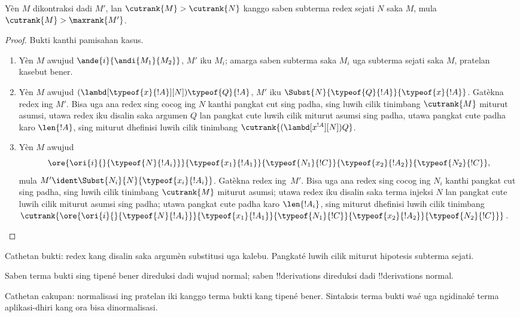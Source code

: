 \documentclass[../../../include/open-logic-section]{subfiles}
\begin{document}
\begin{lem}
  Yèn $M$ dikontraksi dadi $M'$, lan $\cutrank{M} > \cutrank{N}$ kanggo
  saben subterma redex sejati $N$ saka $M$, mula $\cutrank{M} >
  \maxrank{M'}$.
\end{lem}

\begin{proof}
  Bukti kanthi pamisahan kasus.
  \begin{enumerate}
  \item Yèn $M$ awujud $\ande{i}{\andi{M_1}{M_2}}$, $M'$ iku
    $M_i$; amarga saben subterma saka $M_i$ uga subterma sejati
    saka $M$, pratelan kasebut bener.
  \item Yèn $M$ awujud
    $(\lambd[\typeof{x}{!A}][N])\typeof{Q}{!A}$, $M'$ iku
    $\Subst{N}{\typeof{Q}{!A}}{\typeof{x}{!A}}$. Gatèkna redex ing
    $M'$. Bisa uga ana redex sing cocog ing $N$ kanthi pangkat cut
    sing padha, sing luwih cilik tinimbang $\cutrank{M}$ miturut asumsi,
    utawa redex iku disalin saka argumen $Q$ lan pangkat cute luwih cilik
    miturut asumsi sing padha, utawa pangkat cute padha karo $\len{!A}$,
    sing miturut dhefinisi luwih cilik tinimbang
    $\cutrank{(\lambd[x^{!A}][N])Q}$.
  \item Yèn $M$ awujud
    \[
    \ore{\ori{i}{}{\typeof{N}{!A_i}}}
        {\typeof{x_1}{!A_1}}{\typeof{N_1}{!C}}
        {\typeof{x_2}{!A_2}}{\typeof{N_2}{!C}},
    \]
    mula $M' \ident \Subst{N_i}{N}{\typeof{x_i}{!A_i}}$. Gatèkna
    redex ing~$M'$. Bisa uga ana redex sing cocog ing $N_i$ kanthi
    pangkat cut sing padha, sing luwih cilik tinimbang $\cutrank{M}$ miturut
    asumsi; utawa redex iku disalin saka terma injeksi $N$ lan pangkat cute
    luwih cilik miturut asumsi sing padha; utawa pangkat cute padha karo
    $\len{!A_i}$, sing miturut dhefinisi luwih cilik tinimbang
    $\cutrank{\ore{\ori{i}{}{\typeof{N}{!A_i}}}
      {\typeof{x_1}{!A_1}}{\typeof{N_1}{!C}}
      {\typeof{x_2}{!A_2}}{\typeof{N_2}{!C}}}$.
  \end{enumerate}
\end{proof}
Cathetan bukti: redex kang disalin saka argumèn substitusi uga kalebu. Pangkaté luwih cilik miturut hipotesis subterma sejati.

\begin{thm}
  Saben terma bukti sing tipené bener direduksi dadi wujud normal; saben !!{derivation}s
  direduksi dadi !!{derivation}s normal.
\end{thm}
Cathetan cakupan: normalisasi ing pratelan iki kanggo terma bukti kang tipené bener. Sintaksis terma bukti waé uga ngidinaké terma aplikasi-dhiri kang ora bisa dinormalisasi.
\end{document}
